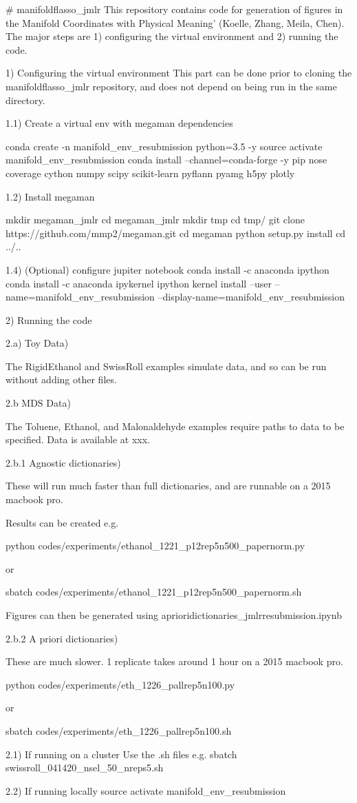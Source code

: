 # manifoldflasso_jmlr
This repository contains code for generation of figures in the Manifold Coordinates with Physical Meaning’ (Koelle, Zhang, Meila, Chen).
The major steps are 1) configuring the virtual environment and 2) running the code.

1) Configuring the virtual environment
This part can be done prior to cloning the manifoldflasso_jmlr repository, and does not depend on being run in the same directory.

1.1) Create a virtual env with megaman dependencies

conda create -n manifold_env_resubmission python=3.5 -y
source activate manifold_env_resubmission
conda install --channel=conda-forge -y pip nose coverage cython numpy scipy scikit-learn pyflann pyamg h5py plotly

1.2) Install megaman

mkdir megaman_jmlr
cd megaman_jmlr
mkdir tmp
cd tmp/
git clone https://github.com/mmp2/megaman.git
cd megaman
python setup.py install
cd ../..

1.4) (Optional) configure jupiter notebook
conda install -c anaconda ipython
conda install -c anaconda ipykernel
ipython kernel install --user --name=manifold_env_resubmission --display-name=manifold_env_resubmission

2) Running the code

2.a) Toy Data)

The RigidEthanol and SwissRoll examples simulate data, and so can be run without adding other files.

2.b MDS Data)

The Toluene, Ethanol, and Malonaldehyde examples require paths to data to be specified.
 Data is available at xxx.

2.b.1 Agnostic dictionaries)

These will run much faster than full dictionaries, and are runnable on a 2015 macbook pro.

Results can be created e.g.

python codes/experiments/ethanol_1221_p12rep5n500_papernorm.py

or

sbatch codes/experiments/ethanol_1221_p12rep5n500_papernorm.sh

Figures can then be generated using aprioridictionaries_jmlrresubmission.ipynb

2.b.2 A priori dictionaries)

These are much slower.  1 replicate takes around 1 hour on a 2015 macbook pro. 

python codes/experiments/eth_1226_pallrep5n100.py

or

sbatch codes/experiments/eth_1226_pallrep5n100.sh



2.1) If running on a cluster
Use the .sh files e.g. 
sbatch swissroll_041420_nsel_50_nreps5.sh

2.2) If running locally
source activate manifold_env_resubmission





